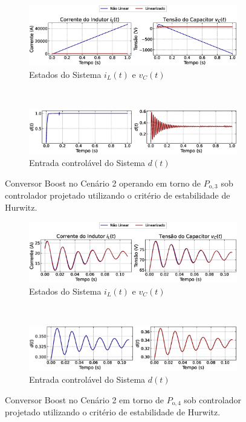 \begin{figure}[H]
  \centering
  \captionsetup{justification=centering}
  \begin{subfigure}{1.\textwidth}
    \centering
    \includegraphics[width=1.\textwidth]{figuras/classic/boost/sim2/op1/result.eps}
    \caption{Estados do Sistema $i_L(t)$  e $v_C(t)$}
  \end{subfigure}
  \\[6pt]
  \begin{subfigure}{1.\textwidth}
    \centering
    \includegraphics[width=1.\textwidth]{figuras/classic/boost/sim2/op1/duty-cycle.eps}
    \caption{Entrada controlável do Sistema $d(t)$}
  \end{subfigure}
  \caption{Conversor Boost no Cenário 2 operando em torno de $P_{\mathrm{o}, 3}$ sob controlador projetado utilizando o critério de estabilidade de Hurwitz.}
  \label{fig:classic_boost_cen2_op1}
  \begin{subfigure}{1.\textwidth}
    \centering
    \includegraphics[width=1.\textwidth]{figuras/classic/boost/sim2/op2/result.eps}
    \caption{Estados do Sistema $i_L(t)$  e $v_C(t)$}
  \end{subfigure}
  \\[6pt]
  \begin{subfigure}{1.\textwidth}
    \centering
    \includegraphics[width=1.\textwidth]{figuras/classic/boost/sim2/op2/duty-cycle.eps}
    \caption{Entrada controlável do Sistema $d(t)$}
  \end{subfigure}
  \caption{Conversor Boost no Cenário 2 em torno de $P_{\mathrm{o}, 4}$ sob controlador projetado utilizando o critério de estabilidade de Hurwitz.}
  \label{fig:classic_boost_cen2_op2}
\end{figure}



